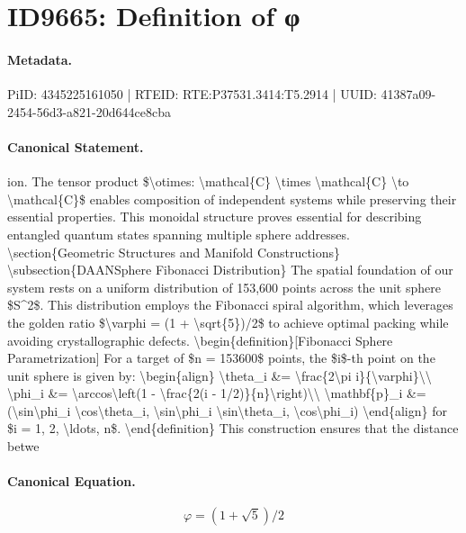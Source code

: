 \section*{ID9665: Definition of φ}
\paragraph{Metadata.}
PiID: 4345225161050 | RTEID: RTE:P37531.3414:T5.2914 | UUID: 41387a09-2454-56d3-a821-20d644ce8cba

\paragraph{Canonical Statement.}
ion. The tensor product \$\textbackslash{}otimes: \textbackslash{}mathcal\{C\} \textbackslash{}times \textbackslash{}mathcal\{C\} \textbackslash{}to \textbackslash{}mathcal\{C\}\$ enables composition of independent systems while preserving their essential properties. This monoidal structure proves essential for describing entangled quantum states spanning multiple sphere addresses. \textbackslash{}section\{Geometric Structures and Manifold Constructions\} \textbackslash{}subsection\{DAANSphere Fibonacci Distribution\} The spatial foundation of our system rests on a uniform distribution of 153,600 points across the unit sphere \$S\textasciicircum{}2\$. This distribution employs the Fibonacci spiral algorithm, which leverages the golden ratio \$\textbackslash{}varphi = (1 + \textbackslash{}sqrt\{5\})/2\$ to achieve optimal packing while avoiding crystallographic defects. \textbackslash{}begin\{definition\}[Fibonacci Sphere Parametrization] For a target of \$n = 153600\$ points, the \$i\$-th point on the unit sphere is given by: \textbackslash{}begin\{align\} \textbackslash{}theta\_i \&= \textbackslash{}frac\{2\textbackslash{}pi i\}\{\textbackslash{}varphi\}\textbackslash{}\textbackslash{} \textbackslash{}phi\_i \&= \textbackslash{}arccos\textbackslash{}left(1 - \textbackslash{}frac\{2(i - 1/2)\}\{n\}\textbackslash{}right)\textbackslash{}\textbackslash{} \textbackslash{}mathbf\{p\}\_i \&= (\textbackslash{}sin\textbackslash{}phi\_i \textbackslash{}cos\textbackslash{}theta\_i, \textbackslash{}sin\textbackslash{}phi\_i \textbackslash{}sin\textbackslash{}theta\_i, \textbackslash{}cos\textbackslash{}phi\_i) \textbackslash{}end\{align\} for \$i = 1, 2, \textbackslash{}ldots, n\$. \textbackslash{}end\{definition\} This construction ensures that the distance betwe

\paragraph{Canonical Equation.}
\[
\varphi = (1 + \sqrt{5})/2
\]

